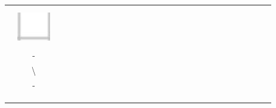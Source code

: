 \documentclass[10pt]{article}
\begin{document}
\begin{center}
\begin{tabular}{|c|c|c|c|c|c|c|c|c|c|c|c|c|c|c|c|c|c|c|c|c|c|c|c|c|c|c|c|}
\hline
 &  &  &  &  &  &  &  &  &  &  &  &  &  &  &  &  &  &  &  &  &  &  &  &  &  &  &  \\
\hline
 &  &  &  &  &  &  &  &  &  &  &  &  &  &  &  &  &  &  &  &  &  &  &  &  &  &  &  \\
\hline
 &  &  &  &  &  &  &  &  &  &  &  &  &  &  &  &  &  &  &  &  &  &  &  &  &  &  &  \\
\hline
 & \includegraphics[max width=\textwidth]{2024_11_21_49bfa1d51da2e7fce9c5g-08}
 &  &  &  &  &  &  &  &  &  &  &  &  &  &  &  &  &  &  &  &  &  &  &  &  &  &  \\
\hline
 &  &  &  &  &  &  &  &  &  &  &  &  &  &  &  &  &  &  &  &  &  &  &  &  &  &  &  \\
\hline
 & - &  &  &  &  &  &  &  &  &  &  &  &  &  &  &  &  &  &  &  &  &  &  &  &  &  &  \\
\hline
 & \textbackslash  &  &  &  &  &  &  &  &  &  &  &  &  &  &  &  &  &  &  &  &  &  &  &  &  &  &  \\
\hline
 & - &  &  &  &  &  &  &  &  &  &  &  &  &  &  &  &  &  &  &  &  &  &  &  &  &  &  \\
\hline
 &  &  &  &  &  &  &  &  &  &  &  &  &  &  &  &  &  &  &  &  &  &  &  &  &  &  &  \\
\hline
 &  &  &  &  &  &  &  &  &  &  &  &  &  &  &  &  &  &  &  &  &  &  &  &  &  &  &  \\
\hline
 &  &  &  &  &  &  &  &  &  &  &  &  &  &  &  &  &  &  &  &  &  &  &  &  &  &  &  \\
\hline

\end{tabular}
\end{center}
\end{document}
